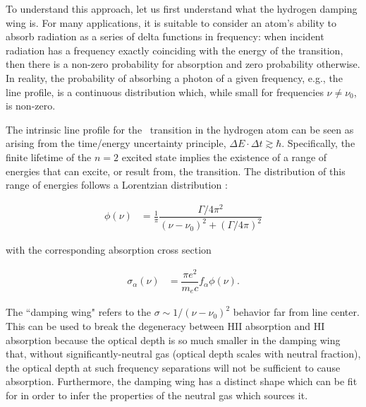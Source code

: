 To understand this approach, let us first understand what the hydrogen damping wing is. For many applications, it is suitable to consider an atom's ability to absorb radiation as a series of delta functions in frequency: when incident radiation has a frequency exactly coinciding with the energy of the transition, then there is a non-zero probability for absorption and zero probability otherwise. In reality, the probability of absorbing a photon of a given frequency, e.g., the line profile, is a continuous distribution which, while small for frequencies $\nu \neq \nu_{0}$, is non-zero. 


The intrinsic line profile for the \lya\ transition in the hydrogen atom can be seen as arising from the time/energy uncertainty principle, $\Delta E \cdot \Delta t \gtrsim \hbar$. Specifically, the finite lifetime of the $n = 2$ excited state implies the existence of a range of energies that can excite, or result from, the transition. The distribution of this range of energies follows a Lorentzian distribution :

\begin{align}
\phi(\nu) &= \frac{1}{\pi} \dfrac{\Gamma/4\pi^{2}}{(\nu - \nu_{0})^{2} + (\Gamma/4\pi)^2}
\end{align}

with the corresponding absorption cross section

\begin{align}
\sigma_{\alpha}(\nu) &= \dfrac{\pi e^2}{m_{e}c} f_{\alpha} \phi(\nu). \label{eq:IntroLineProfile}
\end{align}

The ``damping wing" refers to the $\sigma \sim 1/(\nu-\nu_{0})^{2}$ behavior far from line center. This can be used to break the degeneracy between HII absorption and HI absorption because the optical depth is so much smaller in the damping wing that, without significantly-neutral gas (optical depth scales with neutral fraction), the optical depth at such frequency separations will not be sufficient to cause absorption. Furthermore, the damping wing has a distinct shape which can be fit for in order to infer the properties of the neutral gas which sources it. 


